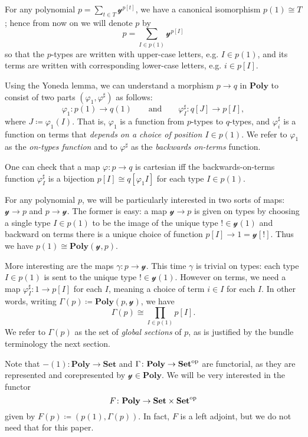 \documentclass[11pt, one side, article]{memoir}
\theoremstyle{definition}
\theoremstyle{plain}
\newenvironment{example}
  {\pushQED{\qed}\renewcommand{\qedsymbol}{$\lozenge$}\examplex}
  {\popQED\endexamplex}
\newenvironment{remark}
  {\pushQED{\qed}\renewcommand{\qedsymbol}{$\lozenge$}\remarkx}
  {\popQED\endremarkx}
\newcommand{\Cat}[1]{\mathbf{#1}}%
\newcommand{\op}{^\tn{op}}
\newcommand{\tn}[1]{\textnormal{#1}}
\newcommand{\smset}{\Cat{Set}}
\newcommand{\yon}{\mathcal{y}}
\newcommand{\poly}{\Cat{Poly}}
\newcommand{\0}{\textsf{0}}
\newcommand{\1}{\tn{\textsf{1}}}
\newcommand{\qqand}{\qquad\text{and}\qquad}
\begin{document}
For any polynomial $p=\sum_{t\in T}\yon^{p[t]}$, we have a canonical isomorphism $p(1)\cong T$; hence from now on we will denote $p$ by
\begin{equation}\label{eqn.poly_notation}
p=\sum_{I\in p(1)}\yon^{p[I]}
\end{equation}
so that the $p$-types are written with upper-case letters, e.g. $I\in p(1)$, and its terms are written with corresponding lower-case letters, e.g. $i\in p[I]$.

\begin{remark}\label{rem.positions_and_directions}
Using the Yoneda lemma, we can understand a morphism $p\to q$ in $\poly$ to consist of two parts $(\varphi_1,\varphi^\sharp)$ as follows:
\begin{equation}\label{eqn.mapsharp}
  \varphi_1\colon p(1)\to q(1)
  \qqand
  \varphi^\sharp_I\colon q[J]\to p[I],
\end{equation}
where $J\coloneqq\varphi_1(I)$. That is, $\varphi_1$ is a function from $p$-types to $q$-types, and $\varphi^\sharp_i$ is a function on terms that \emph{depends on a choice of position $I\in p(1)$}. We refer to $\varphi_1$ as the \emph{on-types function} and to $\varphi^\sharp$ as the \emph{backwards on-terms} function.

One can check that a map $\varphi\colon p\to q$ is cartesian iff the backwards-on-terms function $\varphi^\sharp_I$ is a bijection $p[I]\cong q[\varphi_1I]$ for each type $I\in p(1)$.
\end{remark}

\begin{example}[Positions and global sections, $\Gamma$]\label{ex.pos_glob}
For any polynomial $p$, we will be particularly interested in two sorts of maps: $\yon\to p$ and $p\to\yon$. The former is easy: a map $\yon\to p$ is given on types by choosing a single type $I\in p(1)$ to be the image of the unique type $!\in\yon(1)$ and backward on terms there is a unique choice of function $p[I]\to 1=\yon[!]$. Thus we have $p(1)\cong\poly(\yon,p)$.

More interesting are the maps $\gamma\colon p\to\yon$. This time $\gamma$ is trivial on types: each type $I\in p(1)$ is sent to the unique type $!\in\yon(1)$. However on terms, we need a map $\varphi^\sharp_I\colon 1\to p[I]$ for each $I$, meaning a choice of term $i\in I$ for each $I$. In other words, writing $\Gamma(p)\coloneqq\poly(p,\yon)$, we have
\begin{equation}\label{eqn.global}
\Gamma(p)\cong\prod_{I\in p(1)}p[I].
\end{equation}
We refer to $\Gamma(p)$ as the set of \emph{global sections} of $p$, as is justified by the bundle terminology the next section.

Note that $-(1)\colon\poly\to\smset$ and $\Gamma\colon\poly\to\smset\op$ are functorial, as they are represented and corepresented by $\yon\in\poly$. We will be very interested in the functor
\begin{equation}\label{eqn.fundamental}
F\colon\poly\to\smset\times\smset\op
\end{equation}
given by $F(p)\coloneqq (p(1),\Gamma(p))$. In fact, $F$ is a left adjoint, but we do not need that for this paper.
\end{example}
\end{document}
